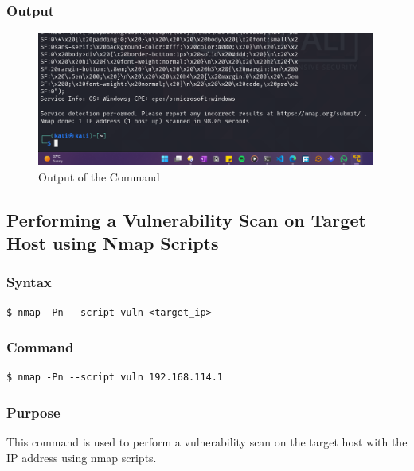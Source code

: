 \documentclass[11pt]{article}
\begin{document}
\subsubsection*{Output}
\begin{figure}[H]
    \centering
    \includegraphics[width=0.99\textwidth]{a3_ss (10).png}
    \caption{Output of the Command}
\end{figure}

\subsection{Performing a Vulnerability Scan on Target Host using Nmap Scripts}

\subsubsection*{Syntax}
\begin{verbatim}
$ nmap -Pn --script vuln <target_ip>
\end{verbatim}

\subsubsection*{Command}
\begin{verbatim}
$ nmap -Pn --script vuln 192.168.114.1
\end{verbatim}

\subsubsection*{Purpose}
This command is used to perform a vulnerability scan on the target host with the IP address using nmap scripts.
\end{document}
